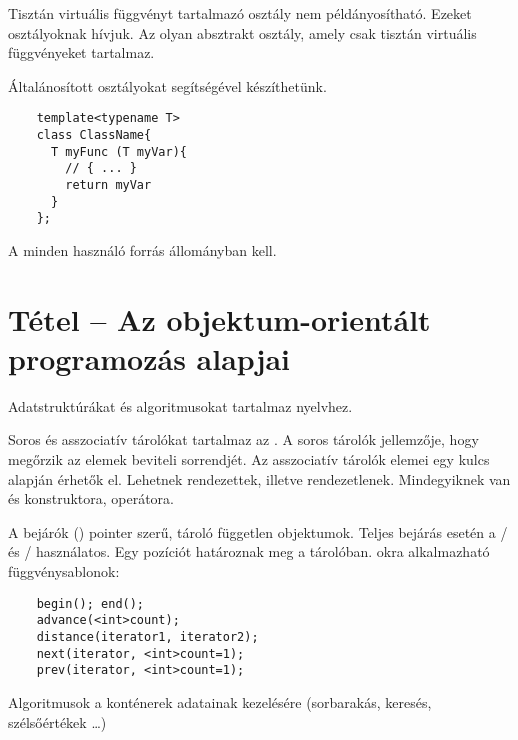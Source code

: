 \documentclass[main.tex]{subfiles}
\begin{document}
  Tisztán virtuális függvényt tartalmazó osztály nem példányosítható.
  Ezeket  osztályoknak hívjuk.
  Az  olyan absztrakt osztály,
  amely csak tisztán virtuális függvényeket tartalmaz.

  Általánosított osztályokat 
  segítségével készíthetünk.
  \begin{lstlisting}
    template<typename T>
    class ClassName{
      T myFunc (T myVar){
        // { ... }
        return myVar
      }
    };
  \end{lstlisting}
  A  minden használó forrás állományban kell.



  \pagebreak
  \section{Tétel – Az objektum-orientált programozás alapjai} %

  Adatstruktúrákat és algoritmusokat tartalmaz
   nyelvhez.

  Soros és asszociatív tárolókat tartalmaz az .
  A soros tárolók jellemzője,
  hogy megőrzik az elemek beviteli sorrendjét.
  Az asszociatív tárolók elemei egy kulcs alapján érhetők el.
  Lehetnek rendezettek, illetve rendezetlenek.
  Mindegyiknek van  és 
  konstruktora, \kkod{=} operátora.

  A bejárók () pointer szerű, tároló
  független objektumok. Teljes bejárás esetén a
  / és
  / használatos.
  Egy pozíciót határoznak meg a tárolóban.
  okra alkalmazható függvénysablonok:
  \begin{lstlisting}
    begin(); end();
    advance(<int>count);
    distance(iterator1, iterator2);
    next(iterator, <int>count=1);
    prev(iterator, <int>count=1);
  \end{lstlisting}

  Algoritmusok a konténerek adatainak kezelésére
  (sorbarakás, keresés, szélsőértékek \dots)
\end{document}
